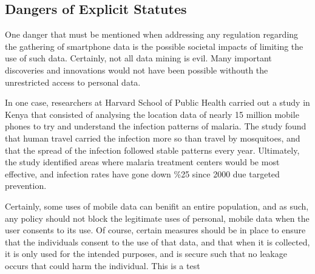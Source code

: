 	\subsection{Dangers of Explicit Statutes} 

One danger that must be mentioned when addressing any regulation regarding the gathering of smartphone data is the possible societal impacts of limiting the use of such data. Certainly, not all data mining is evil. Many important discoveries and innovations would not have been possible withouth the unrestricted access to personal data. 

In one case, researchers at Harvard School of Public Health carried out a study in Kenya that consisted of analysing the location data of nearly 15 million mobile phones to try and understand the infection patterns of malaria\cite{unlock}. The study found that human travel carried the infection more so than travel by mosquitoes, and that the spread of the infection followed stable patterns every year. Ultimately, the study identified areas where malaria treatment centers would be most effective, and infection rates have gone down \%25 since 2000 due targeted prevention. 

Certainly, some uses of mobile data can benifit an entire population, and as such, any policy should not block the legitimate uses of personal, mobile data when the user consents to its use. Of course, certain measures should be in place to ensure that the individuals consent to the use of that data, and that when it is collected, it is only used for the intended purposes, and is secure such that no leakage occurs that could harm the individual.
This is a test 